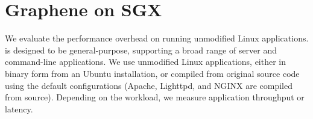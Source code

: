 \section{Graphene on SGX}
\label{sec:eval:sgx}


\label{sec:eval:perf}


We evaluate the performance overhead on running unmodified Linux applications.
\graphenesgx{} is designed to be general-purpose, supporting a broad range of
server and command-line applications. 
We use unmodified Linux applications, either in binary form 
from an Ubuntu installation, or compiled from original source code using the default configurations
(Apache, Lighttpd, and NGINX are compiled from source). %
Depending on the workload, we measure application throughput or latency.


